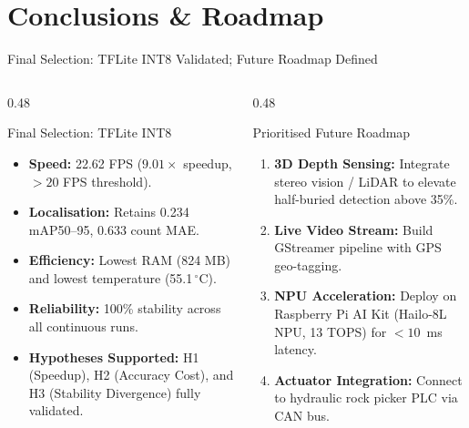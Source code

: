 \documentclass[aspectratio=169,10pt]{beamer}
\begin{document}
\section{Conclusions \& Roadmap}
\begin{frame}{Final Selection: TFLite INT8 Validated; Future Roadmap Defined}
\begin{columns}[T]
  \begin{column}{0.48\textwidth}
    \begin{block}{\small Final Selection: TFLite INT8}
      \small
      \begin{itemize}
        \item \textbf{Speed:} 22.62 FPS ($9.01\times$ speedup, $>20$ FPS threshold).
        \item \textbf{Localisation:} Retains 0.234 mAP50--95, 0.633 count MAE.
        \item \textbf{Efficiency:} Lowest RAM (824 MB) and lowest temperature (55.1\,$^\circ$C).
        \item \textbf{Reliability:} 100\% stability across all continuous runs.
        \item \textbf{Hypotheses Supported:} H1 (Speedup), H2 (Accuracy Cost), and H3 (Stability Divergence) fully validated.
      \end{itemize}
    \end{block}
  \end{column}
  \begin{column}{0.48\textwidth}
    \begin{block}{\small Prioritised Future Roadmap}
      \small
      \begin{enumerate}
        \item \textbf{3D Depth Sensing:} Integrate stereo vision / LiDAR to elevate half-buried detection above 35\%.
        \item \textbf{Live Video Stream:} Build GStreamer pipeline with GPS geo-tagging.
        \item \textbf{NPU Acceleration:} Deploy on Raspberry Pi AI Kit (Hailo-8L NPU, 13 TOPS) for $<10$~ms latency.
        \item \textbf{Actuator Integration:} Connect to hydraulic rock picker PLC via CAN bus.
      \end{enumerate}
    \end{block}
  \end{column}
\end{columns}
\end{frame}
\end{document}
